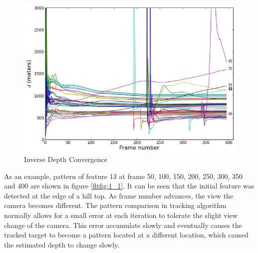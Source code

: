 \begin{figure}[h]
\centering
\includegraphics[width=12cm, keepaspectratio=true]{./Figures/fltfig/cut1/Figure10.png}
\caption{Inverse Depth Convergence}
\label{fltfig:1}
\end{figure}

As an example, pattern of feature 13 at frame 50, 100, 150, 200, 250,
300, 350 and 400 are shown in figure \ref{fltfig:1_1}. It can be seen
that the initial feature was detected at the edge of a hill top. As
frame number advances, the view the camera becomes different. The
pattern comparison in tracking algorithm normally allows for a small
error at each iteration to tolerate the slight view change of the
camera. This error accumulate slowly and eventually causes the tracked
target to become a pattern located at a different location, which caused
the estimated depth to change slowly.

